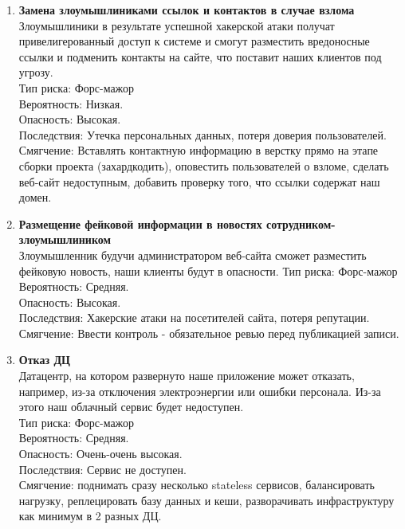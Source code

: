 \begin{enumerate}
      \item \textbf{Замена злоумышлиниками ссылок и контактов в случае взлома} \\
            Злоумышлиники в результате успешной хакерской атаки получат привелигерованный
            доступ к системе и смогут разместить вредоносные ссылки и подменить контакты
            на сайте, что поставит наших клиентов под угрозу. \\
            Тип риска: Форс-мажор \\
            Вероятность: Низкая. \\
            Опасность: Высокая. \\
            Последствия: Утечка персональных данных, потеря доверия пользователей. \\
            Смягчение: Вставлять контактную информацию в верстку прямо на этапе
            сборки проекта (захардкодить), оповестить пользователей о взломе,
            сделать веб-сайт недоступным, добавить проверку того, что ссылки содержат 
            наш домен.

      \item \textbf{Размещение фейковой информации в новостях сотрудником-злоумышлиником} \\
            Злоумышленник будучи администратором веб-сайта сможет разместить фейковую новость,
            наши клиенты будут в опасности.
            Тип риска: Форс-мажор \\
            Вероятность: Средняя. \\
            Опасность: Высокая. \\
            Последствия: Хакерские атаки на посетителей сайта, потеря репутации. \\
            Смягчение: Ввести контроль - обязательное ревью перед публикацией записи. \\

      \item \textbf{Отказ ДЦ} \\
            Датацентр, на котором развернуто наше приложение может отказать, например,
            из-за отключения электроэнергии или ошибки персонала. Из-за этого наш облачный
            сервис будет недоступен. \\
            Тип риска: Форс-мажор \\
            Вероятность: Средняя. \\
            Опасность: Очень-очень высокая. \\
            Последствия: Сервис не доступен. \\
            Смягчение: поднимать сразу несколько stateless сервисов,
            балансировать нагрузку, реплецировать базу данных и кеши,
            разворачивать инфраструктуру как минимум в 2 разных ДЦ.


\end{enumerate}

